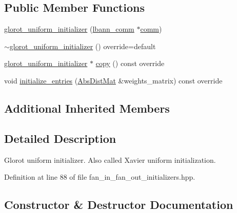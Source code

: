 \subsection*{Public Member Functions}
\begin{DoxyCompactItemize}
\item 
\hyperlink{classlbann_1_1glorot__uniform__initializer_a1958289232a04f13ce340a684620be55}{glorot\+\_\+uniform\+\_\+initializer} (\hyperlink{classlbann_1_1lbann__comm}{lbann\+\_\+comm} $\ast$\hyperlink{file__io_8cpp_ab048c6f9fcbcfaa57ce68b00263dbebe}{comm})
\item 
\hyperlink{classlbann_1_1glorot__uniform__initializer_ae48941eb831bc30cc405db1f4ef62583}{$\sim$glorot\+\_\+uniform\+\_\+initializer} () override=default
\item 
\hyperlink{classlbann_1_1glorot__uniform__initializer}{glorot\+\_\+uniform\+\_\+initializer} $\ast$ \hyperlink{classlbann_1_1glorot__uniform__initializer_a3c5790bf2e7b0e771d3ed1d93c8f255f}{copy} () const override
\item 
void \hyperlink{classlbann_1_1glorot__uniform__initializer_a3a44410934f791cee272183a6a36ae0c}{initialize\+\_\+entries} (\hyperlink{base_8hpp_a9a697a504ae84010e7439ffec862b470}{Abs\+Dist\+Mat} \&weights\+\_\+matrix) const override
\end{DoxyCompactItemize}
\subsection*{Additional Inherited Members}


\subsection{Detailed Description}
Glorot uniform initializer. Also called Xavier uniform initialization. 

Definition at line 88 of file fan\+\_\+in\+\_\+fan\+\_\+out\+\_\+initializers.\+hpp.



\subsection{Constructor \& Destructor Documentation}
\mbox{\label{classlbann_1_1glorot__uniform__initializer_a1958289232a04f13ce340a684620be55}} 
